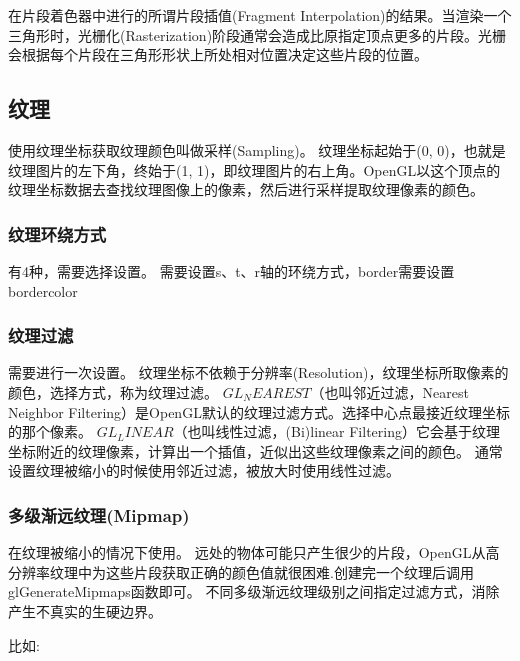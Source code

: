 \documentclass[UTF8]{article}
\begin{document}
在片段着色器中进行的所谓片段插值(Fragment Interpolation)的结果。当渲染一个三角形时，光栅化(Rasterization)阶段通常会造成比原指定顶点更多的片段。光栅会根据每个片段在三角形形状上所处相对位置决定这些片段的位置。



\subsection{纹理}
使用纹理坐标获取纹理颜色叫做采样(Sampling)。
纹理坐标起始于(0, 0)，也就是纹理图片的左下角，终始于(1, 1)，即纹理图片的右上角。OpenGL以这个顶点的纹理坐标数据去查找纹理图像上的像素，然后进行采样提取纹理像素的颜色。

\subsubsection{纹理环绕方式}
有4种，需要选择设置。
需要设置s、t、r轴的环绕方式，border需要设置bordercolor
\begin{comment}
    环绕方式	描述
GL_REPEAT	对纹理的默认行为。重复纹理图像。
GL_MIRRORED_REPEAT	和GL_REPEAT一样，但每次重复图片是镜像放置的。
GL_CLAMP_TO_EDGE	纹理坐标会被约束在0到1之间，超出的部分会重复纹理坐标的边缘，产生一种边缘被拉伸的效果。
GL_CLAMP_TO_BORDER	超出的坐标为用户指定的边缘颜色。
\end{comment}

\subsubsection{纹理过滤}
需要进行一次设置。
纹理坐标不依赖于分辨率(Resolution)，纹理坐标所取像素的颜色，选择方式，称为纹理过滤。
$GL_NEAREST$（也叫邻近过滤，Nearest Neighbor Filtering）是OpenGL默认的纹理过滤方式。选择中心点最接近纹理坐标的那个像素。
$GL_LINEAR$（也叫线性过滤，(Bi)linear Filtering）它会基于纹理坐标附近的纹理像素，计算出一个插值，近似出这些纹理像素之间的颜色。
通常设置纹理被缩小的时候使用邻近过滤，被放大时使用线性过滤。




\subsubsection{多级渐远纹理(Mipmap)}
在纹理被缩小的情况下使用。
远处的物体可能只产生很少的片段，OpenGL从高分辨率纹理中为这些片段获取正确的颜色值就很困难.创建完一个纹理后调用glGenerateMipmaps函数即可。
不同多级渐远纹理级别之间指定过滤方式，消除产生不真实的生硬边界。
\begin{comment}
过滤方式	描述
GL_NEAREST_MIPMAP_NEAREST	使用最邻近的多级渐远纹理来匹配像素大小，并使用邻近插值进行纹理采样
GL_LINEAR_MIPMAP_NEAREST	使用最邻近的多级渐远纹理级别，并使用线性插值进行采样
GL_NEAREST_MIPMAP_LINEAR	在两个最匹配像素大小的多级渐远纹理之间进行线性插值，使用邻近插值进行采样
GL_LINEAR_MIPMAP_LINEAR	在两个邻近的多级渐远纹理之间使用线性插值，并使用线性插值进行采样
\end{comment}
比如:
\end{document}
